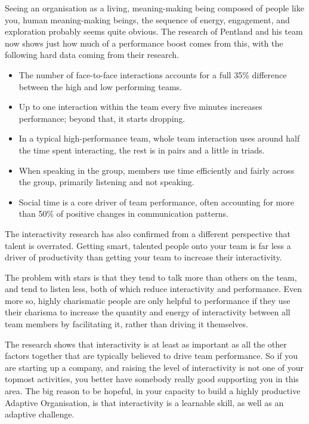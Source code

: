 Seeing an organisation as a living, meaning\hyp{}making being composed of people like you, human meaning\hyp{}making beings, the sequence of energy, engagement, and exploration probably seems quite obvious. The research of Pentland and his team now shows just how much of a performance boost comes from this\cite{pentland-new-science-great-teams, pentland-hard-science-teamwork}, with the following hard data coming from their research. 


\begin{itemize}
\item The number of face-to-face interactions accounts for a full 35\% difference between the high and low performing teams. 


\item Up to one interaction within the team every five minutes increases performance; beyond that, it starts dropping. 


\item In a typical high-performance team, whole team interaction uses around half the time spent interacting, the rest is in pairs and a little in triads. 


\item When speaking in the group, members use time efficiently and fairly across the group, primarily listening and not speaking. 


\item Social time is a core driver of team performance, often accounting for more than 50\% of positive changes in communication patterns.
\end{itemize}


The interactivity research has also confirmed from a different perspective that talent is overrated. Getting smart, talented people onto your team is far less a driver of productivity than getting your team to increase their interactivity. 


The problem with stars is that they tend to talk more than others on the team, and tend to listen less, both of which reduce interactivity and performance. Even more so, highly charismatic people are only helpful to performance if they use their charisma to increase the quantity and energy of interactivity between all team members by facilitating it, rather than driving it themselves.


The research shows that interactivity is at least as important as all the other factors together that are typically believed to drive team performance. So if you are starting up a company, and raising the level of interactivity is not one of your topmost activities, you better have somebody really good supporting you in this area. The big reason to be hopeful, in your capacity to build a highly productive Adaptive Organisation, is that interactivity is a learnable skill, as well as an adaptive challenge.


